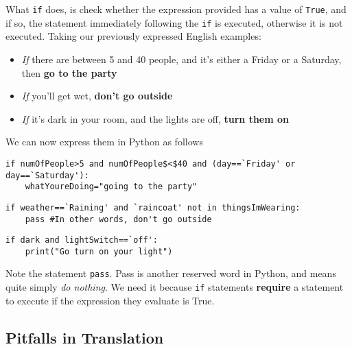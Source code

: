What \texttt{if} does, is check whether the expression provided has a value   of \texttt{True}, and if so, the statement immediately following the \texttt{if} is   executed, otherwise it is not executed.    Taking our previously expressed English examples:
\begin{itemize}
	\item \textit{If} there are between 5 and 40 people, and it's either a Friday or a Saturday, then \textbf{ go to the party}
	\item \textit{If} you'll get wet, \textbf{don't go outside}
	\item \textit{If} it's dark in your room, and the lights are off, \textbf{turn them on}
\end{itemize}

We can now express them in Python as follows
\begin{lstlisting}
if numOfPeople>5 and numOfPeople$<$40 and (day==`Friday' or day==`Saturday'):
    whatYoureDoing="going to the party"
\end{lstlisting}
\begin{lstlisting}
if weather==`Raining' and `raincoat' not in thingsImWearing: 
    pass #In other words, don't go outside
\end{lstlisting}
\begin{lstlisting}
if dark and lightSwitch==`off':
    print("Go turn on your light")
\end{lstlisting}

Note the statement 
\texttt{pass}. Pass   is another reserved word in Python, and means quite simply \textit{do   nothing}. We need it because \texttt{if} statements \textbf{require} a   statement to execute if the expression they evaluate is True.

\subsection{Pitfalls in Translation}

